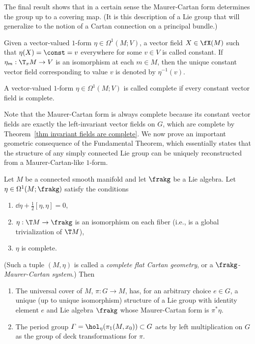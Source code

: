 The final result shows that in a certain sense the Maurer-Cartan form determines the group up to a covering map. (It is this description of a Lie group that will generalize to the notion of a Cartan connection on a principal bundle.)

\begin{defn}\label{def constant vector field}
    Given a vector-valued $1$-form $\eta\in\Omega^1(M;V)$, a vector field $X\in\fX(M)$ such that $\eta(X)=\const=v$ everywhere for some $v\in V$ is called constant. If $\eta_m:\T_x M\to V$ is an isomorphism at each $m\in M$, then the unique constant vector field corresponding to value $v$ is denoted by $\eta^{-1}(v)$.
\end{defn}
\begin{defn}\label{def complete form}
    A vector-valued $1$-form $\eta\in\Omega^1(M;V)$ is called complete if every constant vector field is complete.
\end{defn}

Note that the Maurer-Cartan form is always complete because its constant vector fields are exactly the left-invariant vector fields on $G$, which are complete by Theorem~\ref{thm invariant fields are complete}. We now prove an important geometric consequence of the Fundamental Theorem, which essentially states that the structure of any simply connected Lie group can be uniquely reconstructed from a Maurer-Cartan-like $1$-form.


\begin{thm}\label{thm 8.7 Sharpe}
    Let $M$ be a connected smooth manifold and let $\frakg$ be a Lie algebra. Let $\eta\in\Omega^1(M;\frakg)$ satisfy the conditions
    \begin{enumerate}[label=(\roman*)]
        \item $\dd\eta+\frac12[\eta,\eta]=0$,
        \item $\eta:\T M\to \frakg$ is an isomorphism on each fiber (i.e., is a global trivialization of $\T M$),
        \item $\eta$ is complete.
    \end{enumerate}
    (Such a tuple $(M,\eta)$ is called a \emph{complete flat Cartan geometry}, or a \emph{$\frakg$-Maurer-Cartan system}.)
    Then
    \begin{enumerate}[label=(\alph*)]
        \item The universal cover of $M$, $\pi:G\to M$, has, for an arbitrary choice $e\in G$, a unique (up to unique isomorphism) structure of a Lie group with identity element $e$ and Lie algebra $\frakg$ whose Maurer-Cartan form is $\pi^\ast\eta$.
        \item The period group $\varGamma=\hol_\eta(\pi_1(M,x_0))\subset G$ acts by left multiplication on $G$ as the group of deck transformations for $\pi$.
    \end{enumerate}
\end{thm}

